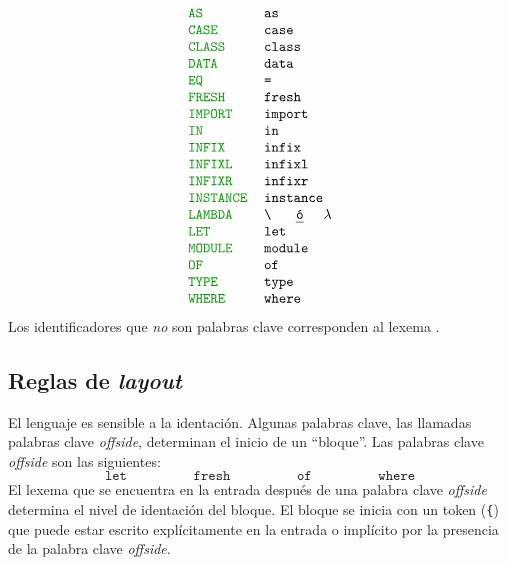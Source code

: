 \[
\begin{tabular}{ll}
 \token{AS} & \texttt{as} \\
 \token{CASE} & \texttt{case} \\
 \token{CLASS} & \texttt{class} \\
 \token{DATA} & \texttt{data} \\
 \token{EQ} & \texttt{=} \\
 \token{FRESH} & \texttt{fresh} \\
 \token{IMPORT} & \texttt{import} \\
 \token{IN} & \texttt{in} \\
 \token{INFIX} & \texttt{infix} \\
 \token{INFIXL} & \texttt{infixl} \\
 \token{INFIXR} & \texttt{infixr} \\
 \token{INSTANCE} & \texttt{instance} \\
 \token{LAMBDA} & \verb|\| \HS\texttt{{\em ó}}\HS $\lambda$ \\
 \token{LET} & \texttt{let} \\
 \token{MODULE} & \texttt{module} \\
 \token{OF} & \texttt{of} \\
 \token{TYPE} & \texttt{type} \\
 \token{WHERE} & \texttt{where} \\
\end{tabular}
\]
Los identificadores que {\em no} son palabras clave corresponden al
lexema . 

\subsection{Reglas de {\em layout}}

El lenguaje \nuflo es sensible a la identación.
Algunas palabras clave, las llamadas palabras clave {\em offside},
determinan el inicio de un ``bloque''.
Las palabras clave {\em offside} son las siguientes:
\[
  \texttt{let}
  \hspace{2cm}
  \texttt{fresh}
  \hspace{2cm}
  \texttt{of}
  \hspace{2cm}
  \texttt{where}
\]
El lexema que se encuentra en la entrada
después de una palabra clave {\em offside}
determina el nivel de identación del bloque.
El bloque se inicia con un token  (\verb|{|)
que puede estar escrito explícitamente en la entrada
o implícito por la presencia de la palabra clave
{\em offside}.

